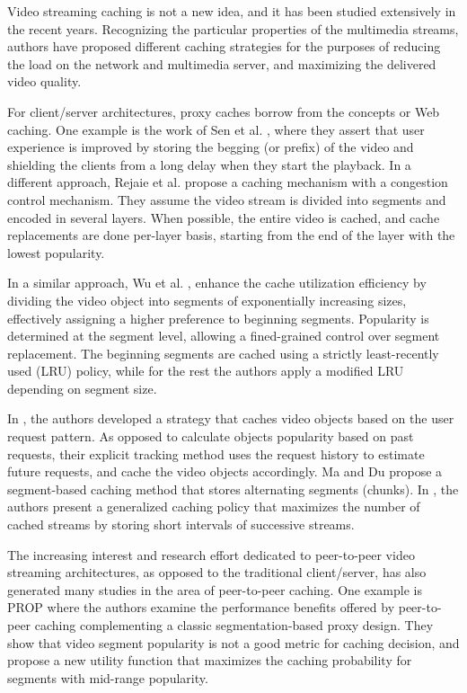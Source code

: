 \documentclass{acm_proc_article-sp}
\begin{document}
Video streaming caching is not a new idea, and it has been studied extensively in the recent years. Recognizing the particular properties of the multimedia streams, authors have proposed different caching strategies for the purposes of reducing the load on the network and multimedia server, and maximizing the delivered video quality.

For client/server architectures, proxy caches borrow from the concepts or Web caching. One example is the work of Sen et al. \cite{sen1999proxy}, where they assert that user experience is improved by storing the begging (or prefix) of the video and shielding the clients from a long delay when they start the playback. In a different approach, Rejaie et al. \cite{rejaie1999proxy,rejaie2000multimedia} propose a caching mechanism with a congestion control mechanism. They assume the video stream is divided into segments and encoded in several layers. When possible, the entire video is cached, and cache replacements are done per-layer basis, starting from the end of the layer with the lowest popularity.

In a similar approach, Wu et al. \cite{wu2001segment}, enhance the cache utilization efficiency by dividing the video object into segments of exponentially increasing sizes, effectively assigning a higher preference to beginning segments. Popularity is determined at the segment level, allowing a fined-grained control over segment replacement. The beginning segments are cached using a strictly least-recently used (LRU) policy, while for the rest the authors apply a modified LRU depending on segment size.

In \cite{reisslein2002interactive}, the authors developed a strategy that caches video objects based on the user request pattern. As opposed to calculate objects popularity based on past requests, their explicit tracking method uses the request history to estimate future requests, and cache the video objects accordingly. Ma and Du \cite{ma2002reducing} propose a segment-based caching method that stores alternating segments (chunks). In \cite{dan1997multimedia}, the authors present a generalized caching policy that maximizes the number of cached streams by storing short intervals of successive streams.

The increasing interest and research effort dedicated to peer-to-peer video streaming architectures, as opposed to the traditional client/server, has also generated many studies in the area of peer-to-peer caching. One example is PROP \cite{guo2004prop,chen2006design} where the authors examine the performance benefits offered by peer-to-peer caching complementing a classic segmentation-based proxy design. They show that video segment popularity is not a good metric for caching decision, and propose a new utility function that maximizes the caching probability for segments with mid-range popularity.
\end{document}
